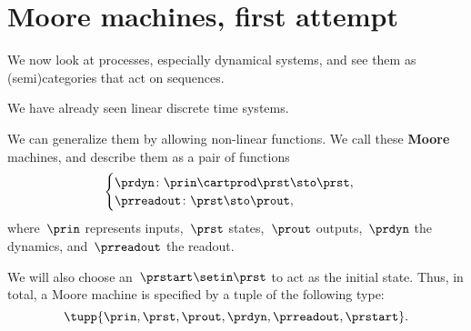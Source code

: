 
\section{Moore machines, first attempt}
\label{sec:moore-machines}



    We now look at processes, especially dynamical systems, and see them as (semi)\-categories that act on sequences.

    We have already seen linear discrete time systems.

    We can generalize them by allowing non-linear functions.
    We call these \textbf{Moore} machines, and describe them as a pair of functions
    \begin{equation}
        \label{eq:moore-1}
        \begin{cases}
            \prdyn \colon \prin \cartprod \prst \sto \prst, \\
            \prreadout \colon \prst \sto \prout,
        \end{cases}
    \end{equation}
    where~$\prin$ represents inputs,~$\prst$ states,~$\prout$ outputs,~$\prdyn$ the dynamics, and~$\prreadout$ the readout.
    

    We will also choose an~$\prstart \setin \prst$ to act as the initial state. Thus, in total, a Moore machine is specified by a tuple of the following type: 
    \begin{equation}
        \label{eq:moore-tuple}
        \tupp{\prin,\prst,\prout,\prdyn,\prreadout,\prstart}.
    \end{equation}
    

